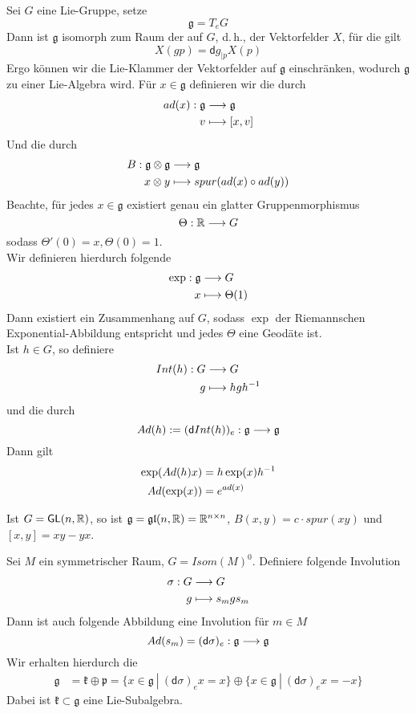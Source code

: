 \documentclass{book}
\renewcommand{\d}{\textsf{d}}
\newcommand{\g}{\mathfrak{g}}
\newcommand{\kf}{\mathfrak{k}}
\newcommand{\p}{\mathfrak{p}}
\newcommand{\GL}{\textsf{GL}(n,\R)}
\newcommand{\glf}{\mathfrak{gl}(n,\R)}
\begin{document}
\Bem{}
Sei $G$ eine Lie-Gruppe, setze
\[ \g = T_eG \]
Dann ist $\g$ isomorph zum Raum der  auf $G$, d.\,h., der Vektorfelder $X$, für die gilt
\[ X(gp) = \d g_{|p}X(p) \]
Ergo können wir die Lie-Klammer der Vektorfelder auf $\g$ einschränken, wodurch $\g$ zu einer Lie-Algebra wird. Für $x\in\g$ definieren wir die  durch
\begin{align*}
ad(x) : \g & \Pfeil{} \g\\
v & \longmapsto [x,v]
\end{align*}
Und die  durch
\begin{align*}
B : \g \otimes \g &\Pfeil{} \g\\
x \otimes y & \longmapsto spur(ad(x) \circ ad(y))
\end{align*}
Beachte, für jedes $x \in \g$ existiert genau ein glatter Gruppenmorphismus
\[ \Theta : \mathbb{R} \overset{}{\longrightarrow} G \]
sodass $\Theta'(0) = x, \Theta(0) = 1$.\\
Wir definieren hierdurch folgende 
\begin{align*}
\exp : \g &\Pfeil{} G\\
x &\longmapsto \Theta(1)
\end{align*}
Dann existiert ein Zusammenhang auf $G$, sodass $\exp$ der Riemannschen Exponential-Abbildung entspricht und jedes $\Theta$ eine Geodäte ist.\\
Ist $h\in G$, so definiere
\begin{align*}
Int(h) :G& \overset{}{\longrightarrow} G\\
g & \longmapsto hgh^{-1}
\end{align*}
und die  durch
\[ Ad(h) := (\d Int(h))_{e} : \g \Pfeil{} \g \]
Dann gilt
\begin{align*}
\exp(Ad(h)x) &= h\exp(x)h^{-1}\\
Ad(\exp(x)) &= e^{ad(x)}
\end{align*}

\Bem{}
Ist $G = \GL$, so ist $\g = \glf = \R^{n\times n}$, $B(x,y) = c \cdot spur(xy)$ und $[x,y] = xy -yx$. 

\Bem{}
Sei $M$ ein symmetrischer Raum, $G = Isom(M)^0$. Definiere folgende Involution
\begin{align*}
\sigma : G &\overset{}{\longrightarrow} G\\
g &\longmapsto s_mgs_m
\end{align*}
Dann ist auch folgende Abbildung eine Involution für $m \in M$
\[ Ad(s_m) = (\d\sigma)_{e} : \g \Pfeil{} \g \]
Wir erhalten hierdurch die 
\begin{align*}
\g &= \kf \oplus \p = \{ x \in \g ~|~ (\d\sigma)_{e}x = x \} \oplus \{ x \in \g ~|~ (\d\sigma)_{e}x = -x \}
\end{align*}
Dabei ist $\kf \subset \g$ eine Lie-Subalgebra.
\end{document}
